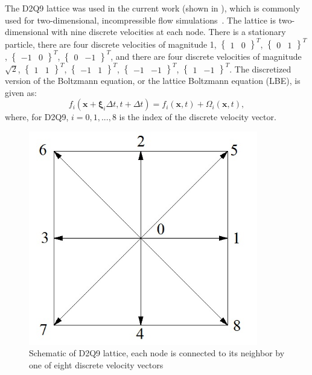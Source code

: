 \documentclass[pdftex,ms]{pittetd}
\newcommand{\pos}{\mathbf{x}}
\newcommand{\pvel}{\boldsymbol{\xi}}
\newcommand{\colop}{\Omega}
\begin{document}
The D2Q9 lattice was used in the current work (shown in ), which is commonly used for two-dimensional, incompressible flow simulations~\cite{Suc01}. %
The lattice is two-dimensional with nine discrete velocities at each node.
There is a stationary particle, there are four discrete velocities of magnitude 1, $\begin{Bmatrix}1 & 0\end{Bmatrix}^T$, $\begin{Bmatrix}0 & 1\end{Bmatrix}^T$, $\begin{Bmatrix}-1 & 0\end{Bmatrix}^T$, $\begin{Bmatrix}0 & -1\end{Bmatrix}^T$, and there are four discrete velocities of magnitude $\sqrt{2}$, $\begin{Bmatrix}1 & 1\end{Bmatrix}^T$, $\begin{Bmatrix}-1 & 1\end{Bmatrix}^T$, $\begin{Bmatrix}-1 & -1\end{Bmatrix}^T$, $\begin{Bmatrix}1 & -1\end{Bmatrix}^T$.
The discretized version of the Boltzmann equation, or the lattice Boltzmann equation (LBE), is given as:
\begin{equation}
f_i(\pos + \pvel_i \Delta t, t + \Delta t) = f_i(\pos, t) + \colop_i(\pos, t),
\end{equation}
\noindent where, for D2Q9, $i = 0, 1, ..., 8$ is the index of the discrete velocity vector.
\begin{figure}
  \centering
  \includegraphics[width=10cm]{figs/d2q9}
  \caption{Schematic of D2Q9 lattice, each node is connected to its neighbor by one of eight discrete velocity vectors}
  \label{fig:d2q9}
\end{figure}
\end{document}
